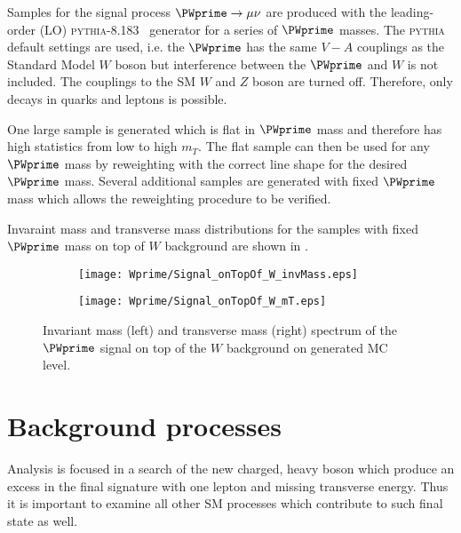 Samples for the signal process $\PWprime \to \mu \nu$ are produced with the leading-order (LO) 
{\scshape pythia-8.183}~\cite{pythia8} generator for a series of $\PWprime$ masses. 
The {\scshape pythia} default settings are used, i.e. the 
$\PWprime$ has the same $V-A$ couplings as the Standard Model $W$ boson but
interference between the $\PWprime$ and $W$ is not included. 
The couplings to the SM $W$ and $Z$ boson are turned off. 
Therefore, only decays in quarks and leptons is possible.

One large sample is generated which is flat in $\PWprime$ mass and therefore has high 
statistics from low to high $m_T$.  The flat sample can then be used for any 
$\PWprime$ mass by reweighting with the correct line shape for the desired $\PWprime$ mass.
Several additional samples are generated with fixed $\PWprime$ mass which
allows the reweighting procedure to be verified.

Invaraint mass and transverse mass distributions for the samples with fixed $\PWprime$ mass on top of $W$ background are shown in .


\begin{figure}
\begin{subfigure}{.5\textwidth}
  \centering
  \texttt{[image: Wprime/Signal\_onTopOf\_W\_invMass.eps]}
\end{subfigure}%
\begin{subfigure}{.5\textwidth}
  \centering
  \texttt{[image: Wprime/Signal\_onTopOf\_W\_mT.eps]}
\end{subfigure}
\caption{Invariant mass (left) and transverse mass (right) spectrum of the $\PWprime$ signal 
on top of the $W$ background on generated MC level.}
  \label{fig:signal_with_W}
\end{figure}



\section{Background processes}
\label{sec:wprimeBackgrounds}

Analysis is focused in a search of the new charged, heavy boson which produce 
an excess in the final signature with one lepton and missing transverse energy.
Thus it is important to examine all other SM processes which contribute 
to such final state as well.

